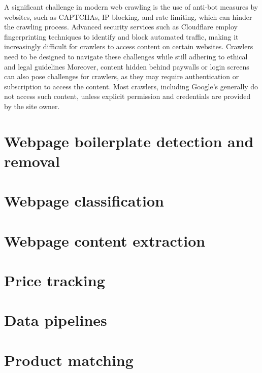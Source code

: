 A significant challenge in modern web crawling is the use of anti-bot measures by websites, such as CAPTCHAs, IP blocking, and rate limiting, which can hinder the crawling process\cite{Kothari_2026}.
Advanced security services such as Cloudflare employ fingerprinting techniques to identify and block automated traffic, making it increasingly difficult for crawlers to access content on certain websites\cite{cloudflare_2026}.
Crawlers need to be designed to navigate these challenges while still adhering to ethical and legal guidelines
Moreover, content hidden behind paywalls or login screens can also pose challenges for crawlers, as they may require authentication or subscription to access the content.
Most crawlers, including Google's\cite{google_2026} generally do not access such content, unless explicit permission and credentials are provided by the site owner.

\section{Webpage boilerplate detection and removal}\label{sec:boilerplate_removal}

\section{Webpage classification}\label{sec:webpage_classification}

\section{Webpage content extraction}\label{sec:content_extraction}

\section{Price tracking}\label{sec:price_tracking}

\section{Data pipelines}\label{sec:data_pipelines}

\section{Product matching}\label{sec:product_matching}

